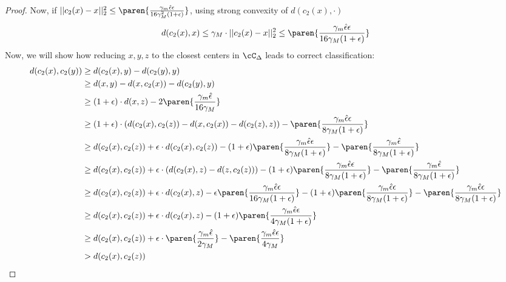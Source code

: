 \begin{proof}
    Now, if $||c_2(x) - x||^2_2 \le \paren{\frac{\gamma_m \hat{\epsilon}\epsilon}{16\gamma_M^2 (1 + \epsilon)}}$, using strong convexity of $d(c_2(x),\cdot)$
    \begin{align*}
        d(c_2(x), x) \le \gamma_M\cdot || c_2 (x) - x ||^2_2 \le \paren{\frac{\gamma_m \hat{\epsilon}\epsilon}{16\gamma_M (1 + \epsilon)}}
        \end{align*}
    Now, we will show how reducing $x,y,z$ to the closest centers in $\cC_{\Delta}$ leads to correct classification:
    \begin{align*}
        d(c_2(x), c_2(y)) &\ge d(c_2(x), y) - d(c_2(y), y)\\
                          & \ge d(x,y) - d(x, c_2(x)) - d(c_2(y), y)\\
                          & \ge (1+ \epsilon)\cdot d(x,z) - 2\paren{\frac{\gamma_m \hat{\epsilon}}{16\gamma_M}}\\
                          & \ge (1 + \epsilon)\cdot (d(c_2(x),c_2(z)) - d(x, c_2(x)) - d(c_2(z), z)) -  \paren{\frac{\gamma_m \hat{\epsilon}\epsilon}{8\gamma_M (1 + \epsilon)}}\\
                          & \ge d(c_2(x),c_2(z)) + \epsilon\cdot d(c_2(x),c_2(z)) - (1 + \epsilon) \paren{\frac{\gamma_m \hat{\epsilon}\epsilon}{8\gamma_M (1 + \epsilon)}} - \paren{\frac{\gamma_m \hat{\epsilon}}{8\gamma_M (1 + \epsilon)}}\\
                          & \ge d(c_2(x),c_2(z)) + \epsilon \cdot (d(c_2(x),z) - d(z, c_2(z))) - (1 + \epsilon) \paren{\frac{\gamma_m \hat{\epsilon}\epsilon}{8\gamma_M (1 + \epsilon)}} - \paren{\frac{\gamma_m \hat{\epsilon}}{8\gamma_M (1 + \epsilon)}}\\
                          & \ge d(c_2(x),c_2(z)) + \epsilon\cdot d(c_2(x),z) - \epsilon \paren{\frac{\gamma_m \hat{\epsilon}\epsilon}{16\gamma_M (1 + \epsilon)}}- (1 + \epsilon) \paren{\frac{\gamma_m \hat{\epsilon}\epsilon}{8\gamma_M (1 + \epsilon)}} - \paren{\frac{\gamma_m \hat{\epsilon}\epsilon}{8\gamma_M (1 + \epsilon)}}\\
                          & \ge d(c_2(x),c_2(z)) + \epsilon\cdot d(c_2(x),z) - (1 + \epsilon)\paren{\frac{\gamma_m \hat{\epsilon}\epsilon}{4\gamma_M (1 + \epsilon)}}\\
                          & \ge d(c_2(x),c_2(z)) + \epsilon \cdot \paren{\frac{\gamma_m \hat{\epsilon}}{2\gamma_M}} - \paren{\frac{\gamma_m \hat{\epsilon}\epsilon}{4\gamma_M}}\\
                          & > d(c_2(x),c_2(z))
    \end{align*}


\end{proof}
